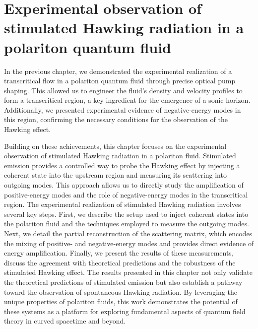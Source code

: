 \graphicspath{{./}{./fig/}{./chap_stimulated_hawking/fig/}}

\chapter{Experimental observation of stimulated Hawking radiation in a polariton quantum fluid}
\label{chap:stimulated_hawking}



In the previous chapter, we demonstrated the experimental realization of a transcritical flow in a polariton quantum fluid through precise optical pump shaping. This allowed us to engineer the fluid's density and velocity profiles to form a transcritical region, a key ingredient for the emergence of a sonic horizon. Additionally, we presented experimental evidence of negative-energy modes in this region, confirming the necessary conditions for the observation of the Hawking effect.

Building on these achievements, this chapter focuses on the experimental observation of stimulated Hawking radiation in a polariton fluid. Stimulated emission provides a controlled way to probe the Hawking effect by injecting a coherent state into the upstream region and measuring its scattering into outgoing modes. This approach allows us to directly study the amplification of positive-energy modes and the role of negative-energy modes in the transcritical region.
The experimental realization of stimulated Hawking radiation involves several key steps. First, we describe the setup used to inject coherent states into the polariton fluid and the techniques employed to measure the outgoing modes. 
Next, we detail the partial reconstruction of the scattering matrix, which encodes the mixing of positive- and negative-energy modes and provides direct evidence of energy amplification.
 Finally, we present the results of these measurements, discuss the agreement with theoretical predictions and the robustness of the stimulated Hawking effect.
The results presented in this chapter not only validate the theoretical predictions of stimulated emission but also establish a pathway toward the observation of spontaneous Hawking radiation. By leveraging the unique properties of polariton fluids, this work demonstrates the potential of these systems as a platform for exploring fundamental aspects of quantum field theory in curved spacetime and beyond.


